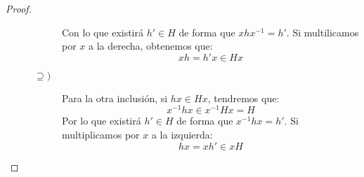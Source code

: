 \begin{prop}
\begin{proof}
\begin{description}
\begin{description}
                        Con lo que existirá $h'\in H$ de forma que $xhx^{-1}=h'$. Si multilicamos por $x$ a la derecha, obtenemos que:
                        \begin{equation*}
                            xh = h'x \in Hx
                        \end{equation*}
                    \item [$\supseteq)$] Para la otra inclusión, si $hx\in Hx$, tendremos que:
                        \begin{equation*}
                            x^{-1}hx \in x^{-1}Hx = H
                        \end{equation*}
                        Por lo que existirá $h'\in H$ de forma que $x^{-1}hx = h'$. Si multiplicamos por $x$ a la izquierda:
                        \begin{equation*}
                            hx = xh' \in xH
                        \end{equation*}
                \end{description}
        \end{description}
    \end{proof}
\end{prop}

